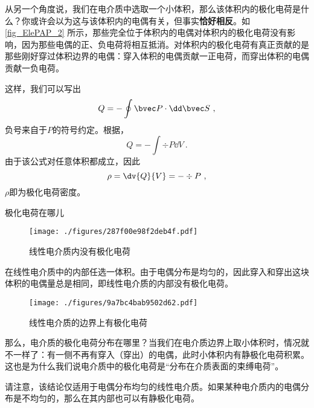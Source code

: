 从另一个角度说，我们在电介质中选取一个小体积，那么该体积内的极化电荷是什么？你或许会以为这与该体积内的电偶有关，但事实\textbf{恰好相反}。如\autoref{fig_ElePAP_2} 所示，那些完全位于体积内的电偶对体积内的极化电荷没有影响，因为那些电偶的正、负电荷将相互抵消。对体积内的极化电荷有真正贡献的是那些刚好穿过体积边界的电偶：穿入体积的电偶贡献一正电荷，而穿出体积的电偶贡献一负电荷。

这样，我们可以写出
$$
Q= - \oint \bvec P \cdot \dd \bvec S~,
$$
负号来自于$P$的符号约定。根据，
$$
Q= - \int \div P \dd V~.
$$
由于该公式对任意体积都成立，因此
\begin{equation}
\rho = \dv{Q}{V}= - \div P~,
\end{equation}
$\rho$即为极化电荷密度。

\begin{example}{极化电荷在哪儿}
\begin{figure}[ht]
\centering
\texttt{[image: ./figures/287f00e98f2deb4f.pdf]}
\caption{线性电介质内没有极化电荷} \label{fig_ElePAP_3}
\end{figure}

在线性电介质中的内部任选一体积。由于电偶分布是均匀的，因此穿入和穿出这块体积的电偶量总是相同，即线性电介质的内部没有极化电荷。

\begin{figure}[ht]
\centering
\texttt{[image: ./figures/9a7bc4bab9502d62.pdf]}
\caption{线性电介质的边界上有极化电荷} \label{fig_ElePAP_4}
\end{figure}
那么，电介质的极化电荷分布在哪里？当我们在电介质边界上取小体积时，情况就不一样了：有一侧不再有穿入（穿出）的电偶，此时小体积内有静极化电荷积累。这也是为什么我们说电介质中的极化电荷是“分布在介质表面的束缚电荷”。

请注意，该结论仅适用于电偶分布均匀的线性电介质。如果某种电介质内的电偶分布是不均匀的，那么在其内部也可以有静极化电荷。
\end{example}

